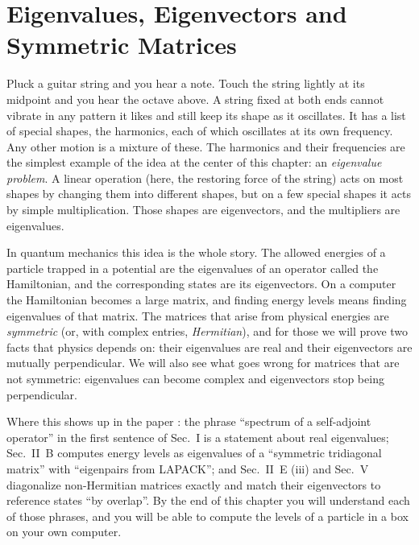 \chapter{Eigenvalues, Eigenvectors and Symmetric Matrices}\label{ch:eigen}

\begin{chapterintro}
Pluck a guitar string and you hear a note. Touch the string lightly at its midpoint and you hear the octave above. A string fixed at both ends cannot vibrate in any pattern it likes and still keep its shape as it oscillates. It has a list of special shapes, the harmonics, each of which oscillates at its own frequency. Any other motion is a mixture of these. The harmonics and their frequencies are the simplest example of the idea at the center of this chapter: an \emph{eigenvalue problem}. A linear operation (here, the restoring force of the string) acts on most shapes by changing them into different shapes, but on a few special shapes it acts by simple multiplication. Those shapes are eigenvectors, and the multipliers are eigenvalues.

In quantum mechanics this idea is the whole story. The allowed energies of a particle trapped in a potential are the eigenvalues of an operator called the Hamiltonian, and the corresponding states are its eigenvectors. On a computer the Hamiltonian becomes a large matrix, and finding energy levels means finding eigenvalues of that matrix. The matrices that arise from physical energies are \emph{symmetric} (or, with complex entries, \emph{Hermitian}), and for those we will prove two facts that physics depends on: their eigenvalues are real and their eigenvectors are mutually perpendicular. We will also see what goes wrong for matrices that are not symmetric: eigenvalues can become complex and eigenvectors stop being perpendicular.

Where this shows up in the paper \cite{soniR1}: the phrase ``spectrum of a self-adjoint operator'' in the first sentence of Sec.~I is a statement about real eigenvalues; Sec.~II~B computes energy levels as eigenvalues of a ``symmetric tridiagonal matrix'' with ``eigenpairs from LAPACK''; and Sec.~II~E (iii) and Sec.~V diagonalize non-Hermitian matrices exactly and match their eigenvectors to reference states ``by overlap''. By the end of this chapter you will understand each of those phrases, and you will be able to compute the levels of a particle in a box on your own computer.
\end{chapterintro}

